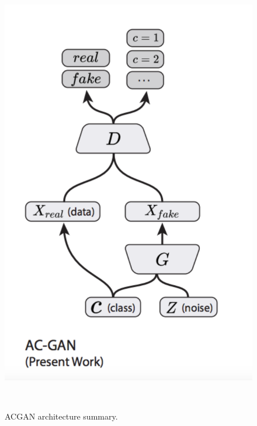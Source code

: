 \documentclass{sigchi}
\begin{document}
\begin{figure}
  \centering
  \includegraphics[width=2\columnwidth]{figures/ACGAN}
  \caption{ACGAN architecture summary.}~\label{fig:figure3}
\end{figure}
\end{document}

